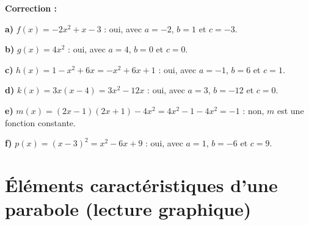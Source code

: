 \documentclass[11pt,a4paper]{book}
\begin{document}
\medskip
\noindent\textbf{\color{red!75!black}Correction :}

\smallskip
\begin{corrBox}
	\textbf{a)} $f(x)=-2x^2+x-3$ : oui, avec $a=-2$, $b=1$ et $c=-3$.
\end{corrBox}

\medskip
\begin{corrBox}
	\textbf{b)} $g(x)=4x^2$ : oui, avec $a=4$, $b=0$ et $c=0$.
\end{corrBox}

\medskip
\begin{corrBox}
	\textbf{c)} $h(x)=1-x^2+6x=-x^2+6x+1$ : oui, avec $a=-1$, $b=6$ et $c=1$.
\end{corrBox}

\medskip
\begin{corrBox}
	\textbf{d)} $k(x)=3x(x-4)=3x^2-12x$ : oui, avec $a=3$, $b=-12$ et $c=0$.
\end{corrBox}

\medskip
\begin{corrBox}
	\textbf{e)} $m(x)=(2x-1)(2x+1)-4x^2=4x^2-1-4x^2=-1$ : non, $m$ est une fonction constante.
\end{corrBox}

\medskip
\begin{corrBox}
	\textbf{f)} $p(x)=(x-3)^2=x^2-6x+9$ : oui, avec $a=1$, $b=-6$ et $c=9$.
\end{corrBox}

\section*{\color{green!55!black}Éléments caractéristiques d'une parabole (lecture graphique)}

\exerciceDS{}
\end{document}
